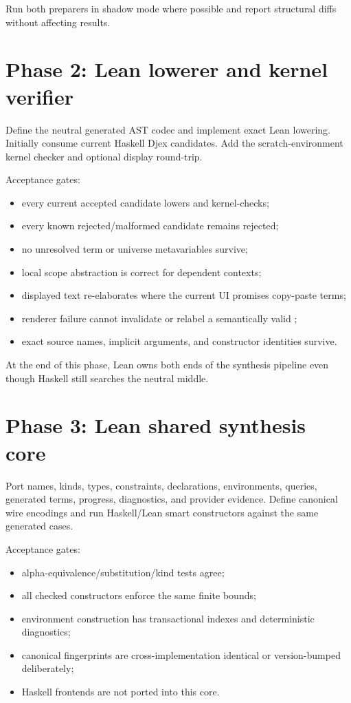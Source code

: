 \documentclass[10pt,letterpaper,oneside]{report}
\newcommand{\code}[1]{\texttt{\detokenize{#1}}}
\begin{document}
Run both preparers in shadow mode where possible and report structural diffs without affecting results.

\section{Phase 2: Lean lowerer and kernel verifier}

Define the neutral generated AST codec and implement exact Lean lowering. Initially consume current Haskell Djex candidates. Add the scratch-environment kernel checker and optional display round-trip.

Acceptance gates:

\begin{itemize}
  \item every current accepted candidate lowers and kernel-checks;
  \item every known rejected/malformed candidate remains rejected;
  \item no unresolved term or universe metavariables survive;
  \item local scope abstraction is correct for dependent contexts;
  \item displayed text re-elaborates where the current UI promises copy-paste terms;
  \item renderer failure cannot invalidate or relabel a semantically valid \code{Expr};
  \item exact source names, implicit arguments, and constructor identities survive.
\end{itemize}

At the end of this phase, Lean owns both ends of the synthesis pipeline even though Haskell still searches the neutral middle.

\section{Phase 3: Lean shared synthesis core}

Port names, kinds, types, constraints, declarations, environments, queries, generated terms, progress, diagnostics, and provider evidence. Define canonical wire encodings and run Haskell/Lean smart constructors against the same generated cases.

Acceptance gates:

\begin{itemize}
  \item alpha-equivalence/substitution/kind tests agree;
  \item all checked constructors enforce the same finite bounds;
  \item environment construction has transactional indexes and deterministic diagnostics;
  \item canonical fingerprints are cross-implementation identical or version-bumped deliberately;
  \item Haskell frontends are not ported into this core.
\end{itemize}
\end{document}
